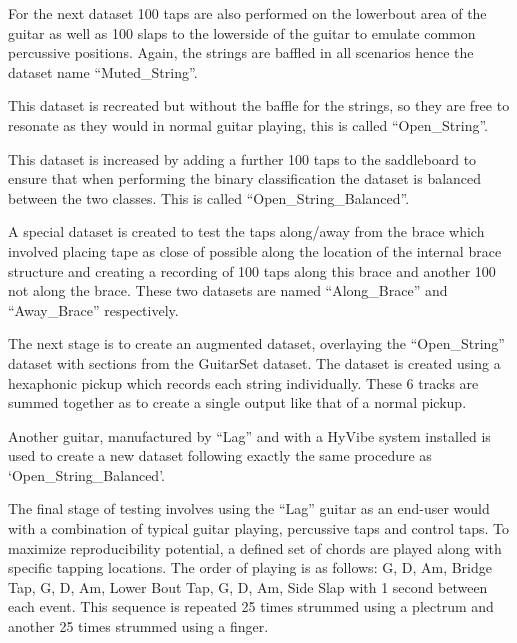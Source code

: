 \documentclass[conference]{IEEEtran}
\begin{document}
For the next dataset 100 taps are also performed on the lowerbout area of the guitar as well as 100 slaps to the lowerside of the guitar to
emulate common percussive positions. Again, the strings are baffled in all scenarios hence the dataset name ``Muted\_String''.

This dataset is recreated but without the baffle for the strings, so they are free to resonate as they would in normal guitar playing, this is called ``Open\_String''. 

This dataset is increased by adding a further 100 taps to the saddleboard to ensure that when performing the binary classification the dataset is balanced between the two classes. This is called ``Open\_String\_Balanced''. 

A special dataset is created to test the taps along/away from the brace which involved placing tape as close of possible along the location of the internal brace structure and creating a recording of 100 taps along this brace and another 100 not along the 
brace. These two datasets are named ``Along\_Brace'' and ``Away\_Brace'' respectively.

The next stage is to create an augmented dataset, overlaying the ``Open\_String'' dataset with sections from the GuitarSet dataset. The dataset is created using a hexaphonic pickup which records each string individually. These 6 tracks are summed together as
to create a single output like that of a normal pickup.

Another guitar, manufactured by ``Lag'' and with a HyVibe system installed is used to create a new dataset following exactly the same procedure as `Open\_String\_Balanced'.

The final stage of testing involves using the ``Lag'' guitar as an end-user would with a combination of typical guitar playing, percussive taps and control taps. 
To maximize reproducibility potential, a defined set of chords are played along with specific tapping locations. The order of playing is as follows: G, D, Am, Bridge Tap, G, D, Am, Lower Bout Tap, G, D, Am, Side Slap with 1 second between each event. This sequence is repeated 25 times strummed using a 
plectrum and another 25 times strummed using a finger. 
\end{document}
